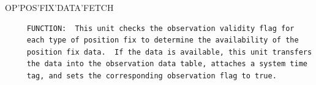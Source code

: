 \begin{frame}
OP'POS'FIX'DATA'FETCH
\begin{verbatim}
     FUNCTION:  This unit checks the observation validity flag for
     each type of position fix to determine the availability of the 
     position fix data.  If the data is available, this unit transfers
     the data into the observation data table, attaches a system time
     tag, and sets the corresponding observation flag to true.




\end{verbatim}
\end{frame}
